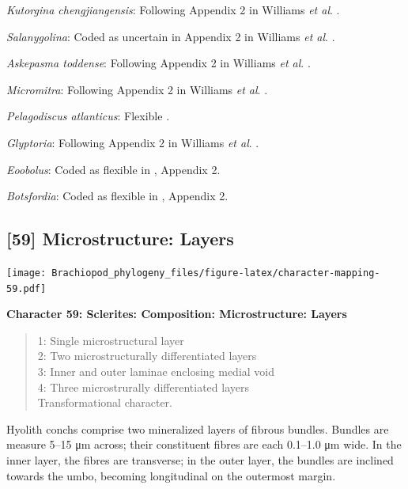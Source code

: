 \documentclass[openany]{book}
\theoremstyle{definition}
\theoremstyle{definition}
\theoremstyle{definition}
\theoremstyle{remark}
\begin{document}
\emph{Kutorgina chengjiangensis}: Following Appendix 2 in Williams
\emph{et al}. \citeyearpar{Williams1998Thediversity}.

\emph{Salanygolina}: Coded as uncertain in Appendix 2 in Williams
\emph{et al}. \citeyearpar{Williams1998Thediversity}.

\emph{Askepasma toddense}: Following Appendix 2 in Williams \emph{et
al}. \citeyearpar{Williams1998Thediversity}.

\emph{Micromitra}: Following Appendix 2 in Williams \emph{et al}.
\citeyearpar{Williams1998Thediversity}.

\emph{Pelagodiscus atlanticus}: Flexible
\citep{Williams1998Thediversity}.

\emph{Glyptoria}: Following Appendix 2 in Williams \emph{et al}.
\citeyearpar{Williams1998Thediversity}.

\emph{Eoobolus}: Coded as flexible in \citet{Williams1998Thediversity},
Appendix 2.

\emph{Botsfordia}: Coded as flexible in
\citet{Williams1998Thediversity}, Appendix 2.

\hypertarget{microstructure-layers}{%
\subsection*{{[}59{]} Microstructure:
Layers}\label{microstructure-layers}}

\texttt{[image: Brachiopod\_phylogeny\_files/figure-latex/character-mapping-59.pdf]}

\textbf{Character 59: Sclerites: Composition: Microstructure: Layers}

\begin{quote}
1: Single microstructural layer\\
2: Two microstructurally differentiated layers\\
3: Inner and outer laminae enclosing medial void\\
4: Three microstrurally differentiated layers\\
Transformational character.
\end{quote}

Hyolith conchs comprise two mineralized layers of fibrous bundles.
Bundles are measure 5--15 μm across; their constituent fibres are each
0.1--1.0 μm wide. In the inner layer, the fibres are transverse; in the
outer layer, the bundles are inclined towards the umbo, becoming
longitudinal on the outermost margin.
\end{document}
